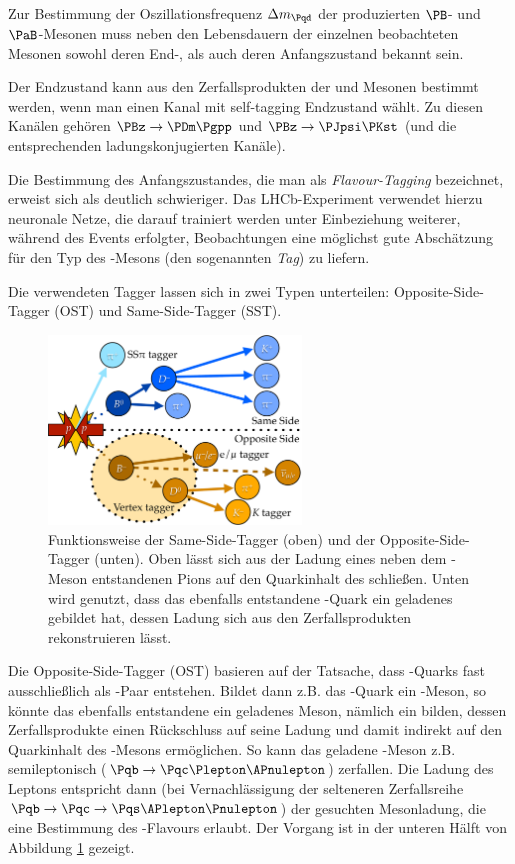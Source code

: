 Zur Bestimmung der Oszillationsfrequenz $\difference{m_{\Pqd}}$ der produzierten $\PB$- und $\PaB$-Mesonen muss neben den Lebensdauern der einzelnen beobachteten Mesonen sowohl deren End-, als auch deren Anfangszustand bekannt sein.

Der Endzustand kann aus den Zerfallsprodukten der \PBz und \PaBz Mesonen bestimmt werden, wenn man einen Kanal mit self-tagging Endzustand wählt.
Zu diesen Kanälen gehören $\PBz \to \PDm \Pgpp$ und $\PBz \to \PJpsi \PKst$ (und die entsprechenden ladungskonjugierten Kanäle).

Die Bestimmung des Anfangszustandes, die man als \emph{Flavour-Tagging} bezeichnet, erweist sich als deutlich schwieriger.
Das LHCb-Experiment verwendet hierzu neuronale Netze, die darauf trainiert werden unter Einbeziehung weiterer, während des Events erfolgter, Beobachtungen eine möglichst gute Abschätzung für den Typ des \PB-Mesons (den sogenannten \emph{Tag}) zu liefern.

Die verwendeten Tagger lassen sich in zwei Typen unterteilen: Opposite-Side-Tagger (OST) und Same-Side-Tagger (SST).

\begin{figure}
  \centering
  \includegraphics[width=0.6\textwidth]{figures/tagging.pdf}
  \caption{Funktionsweise der Same-Side-Tagger (oben) und der Opposite-Side-Tagger (unten). Oben lässt sich aus der Ladung eines neben dem \PB-Meson entstandenen Pions auf den Quarkinhalt des \PB schließen. Unten wird genutzt, dass das ebenfalls entstandene \Pqb-Quark ein geladenes \PBm gebildet hat, dessen Ladung sich aus den Zerfallsprodukten rekonstruieren lässt.}
  \label{tagging}
\end{figure}

Die Opposite-Side-Tagger (OST) basieren auf der Tatsache, dass \Pqb-Quarks fast ausschließlich als \Pqb\Paqb-Paar entstehen. Bildet dann z.B. das \Pqb-Quark ein \PaB-Meson, so könnte das ebenfalls entstandene \Paqb ein geladenes Meson, nämlich ein \PBp bilden, dessen Zerfallsprodukte einen Rückschluss auf seine Ladung und damit indirekt auf den Quarkinhalt des \PaB-Mesons ermöglichen.
So kann das geladene \PB-Meson z.B. semileptonisch ($\Pqb \to \Pqc \Plepton \APnulepton$) zerfallen. Die Ladung des Leptons entspricht dann (bei Vernachlässigung der selteneren Zerfallsreihe $\Pqb \to \Pqc \to \Pqs \APlepton \Pnulepton$) der gesuchten Mesonladung, die eine Bestimmung des \PB-Flavours erlaubt.\cite{ost}
Der Vorgang ist in der unteren Hälft von Abbildung \ref{tagging} gezeigt.

